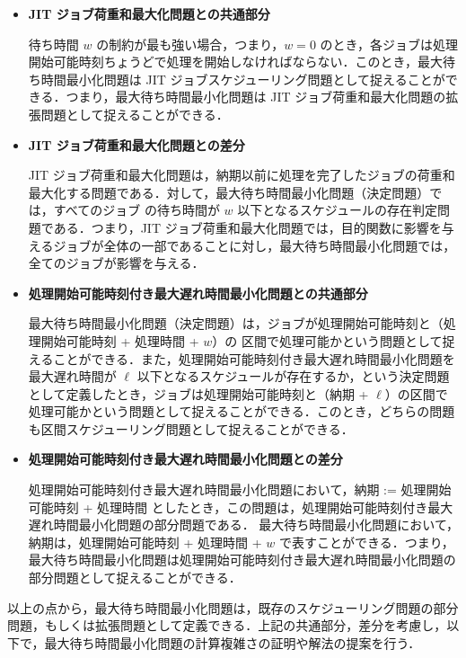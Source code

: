 \documentclass[12pt]{optlab-bachelor}
\begin{document}
\begin{itemize}
  \item \textbf{JIT ジョブ荷重和最大化問題との共通部分}

  待ち時間 $w$ の制約が最も強い場合，つまり，$w = 0$ のとき，各ジョブは処理開始可能時刻ちょうどで処理を開始しなければならない．このとき，最大待ち時間最小化問題は JIT ジョブスケジューリング問題として捉えることができる．つまり，最大待ち時間最小化問題は JIT ジョブ荷重和最大化問題の拡張問題として捉えることができる．

  \item \textbf{JIT ジョブ荷重和最大化問題との差分}

  JIT ジョブ荷重和最大化問題は，納期以前に処理を完了したジョブの荷重和
  最大化する問題である．対して，最大待ち時間最小化問題（決定問題）では，すべてのジョブ
  の待ち時間が $w$ 以下となるスケジュールの存在判定問題である．つまり，JIT ジョブ荷重和最大化問題では，目的関数に影響を与えるジョブが全体の一部であることに対し，最大待ち時間最小化問題では，全てのジョブが影響を与える．

  \item \textbf{処理開始可能時刻付き最大遅れ時間最小化問題との共通部分}

  最大待ち時間最小化問題（決定問題）は，ジョブが処理開始可能時刻と（処理開始可能時刻 + 処理時間 + $w$）の 区間で処理可能かという問題として捉えることができる．また，処理開始可能時刻付き最大遅れ時間最小化問題を最大遅れ時間が $\ell$ 以下となるスケジュールが存在するか，という決定問題として定義したとき，ジョブは処理開始可能時刻と（納期 + $\ell$）の区間で処理可能かという問題として捉えることができる．このとき，どちらの問題も区間スケジューリング問題として捉えることができる．

  \item \textbf{処理開始可能時刻付き最大遅れ時間最小化問題との差分}

  処理開始可能時刻付き最大遅れ時間最小化問題において，納期 := 処理開始可能時刻 + 処理時間 としたとき，この問題は，処理開始可能時刻付き最大遅れ時間最小化問題の部分問題である．
  最大待ち時間最小化問題において，納期は，処理開始可能時刻 + 処理時間 + $w$ で表すことができる．つまり，
  最大待ち時間最小化問題は処理開始可能時刻付き最大遅れ時間最小化問題の部分問題として捉えることができる．

\end{itemize}

以上の点から，最大待ち時間最小化問題は，既存のスケジューリング問題の部分問題，もしくは拡張問題として定義できる．上記の共通部分，差分を考慮し，以下で，最大待ち時間最小化問題の計算複雑さの証明や解法の提案を行う．
\end{document}
